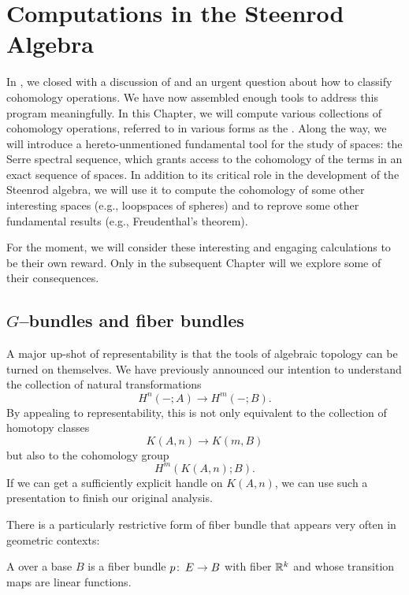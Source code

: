 
\chapter{Computations in the Steenrod Algebra}

In , we closed with a discussion of  and an urgent question about how to classify cohomology operations.
We have now assembled enough tools to address this program meaningfully.
In this Chapter, we will compute various collections of cohomology operations, referred to in various forms as the .
Along the way, we will introduce a hereto-unmentioned fundamental tool for the study of spaces: the Serre spectral sequence, which grants access to the cohomology of the terms in an exact sequence of spaces.
In addition to its critical role in the development of the Steenrod algebra, we will use it to compute the cohomology of some other interesting spaces (e.g., loopspaces of spheres) and to reprove some other fundamental results (e.g., Freudenthal's theorem).

For the moment, we will consider these interesting and engaging calculations to be their own reward.
Only in the subsequent Chapter will we explore some of their consequences.




\section{$G$--bundles and fiber bundles}

A major up-shot of representability is that the tools of algebraic topology can be turned on themselves.
We have previously announced our intention to understand the collection of natural transformations \[H^n(-; A) \to H^m(-; B).\]
By appealing to representability, this is not only equivalent to the collection of homotopy classes \[K(A, n) \to K(m, B)\] but also to the cohomology group \[H^m(K(A, n); B).\]
If we can get a sufficiently explicit handle on $K(A, n)$, we can use such a presentation to finish our original analysis.

There is a particularly restrictive form of fiber bundle that appears very often in geometric contexts:

\begin{definition}
A  over a base $B$ is a fiber bundle $p\colon\thinspace E \to B$ with fiber $\mathbb R^k$ and whose transition maps are linear functions.
\end{definition}


